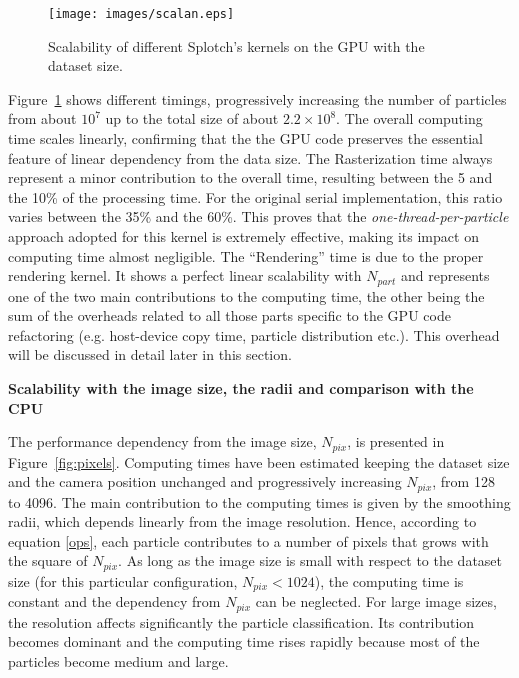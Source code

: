 \documentclass[1p]{elsarticle}
\begin{document}
\begin{figure}
\centering
\texttt{[image: images/scalan.eps]}
\caption{Scalability of different Splotch's kernels on the GPU with the dataset size.}
\label{fig:scalability}
\end{figure}

Figure~\ref{fig:scalability} shows different timings, progressively increasing the number of particles
from about $10^7$ up to the total size of about $2.2\times 10^8$. 
The overall computing time scales linearly, 
confirming that the the GPU code preserves the essential feature of linear dependency from the 
data size. 
The Rasterization time always represent 
a minor contribution to the overall time, resulting between the 5 and the 10\% of the processing 
time. For the original serial implementation, this ratio varies between the 35\% and the 60\%.
This proves that the {\it one-thread-per-particle} approach adopted for this kernel
is extremely effective, making its impact on computing time almost negligible.
The ``Rendering'' time 
is due to the proper rendering kernel. It shows a perfect linear scalability
with $N_{part}$ and represents one of the two main contributions
to the computing time, the other being the sum of the overheads related to all those 
parts specific to the GPU code refactoring 
(e.g. host-device copy time, particle distribution etc.). 
This overhead  will be discussed in detail later in this section.

\medskip
\noindent
{\bf Scalability with the image size, the radii and comparison with the CPU}

\noindent
The performance dependency from the image size, $N_{pix}$, 
is presented in Figure~\ref{fig:pixels}. 
Computing times have been estimated 
keeping the dataset size and the camera position unchanged and progressively increasing
$N_{pix}$, from 128 to 4096. The main contribution to the computing times 
is given by the smoothing radii, which depends linearly from the image resolution.
Hence, according to equation \eqref{ops}, each particle contributes to a number of pixels 
that grows with the square of $N_{pix}$. As long as the image size is small with 
respect to the dataset size (for this particular configuration, $N_{pix} < 1024$), 
the computing time is constant and the dependency from $N_{pix}$ can be neglected. 
For large image sizes, the resolution affects significantly the particle classification. Its contribution becomes dominant and the computing
time rises rapidly because most of the particles become medium and large.  
\end{document}
